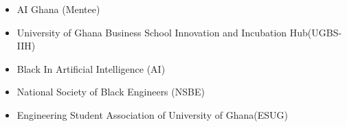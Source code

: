\documentclass[letterpaper,11pt]{article}
\newcommand{\resumeItem}[1]{
  \item\small{
    {#1 \vspace{-2pt}}
  }
}
\newcommand{\resumeItemListStart}{\begin{itemize}}
\newcommand{\resumeItemListEnd}{\end{itemize}\vspace{-5pt}}
\begin{document}
{{{{     \resumeItemListStart
     \resumeItem{AI Ghana (Mentee)} 
     \resumeItem{ University of Ghana Business School Innovation and Incubation Hub(UGBS-IIH)}
     \resumeItem{Black In Artificial Intelligence (AI)} 
     \resumeItem{National Society of Black Engineers (NSBE)}
     \resumeItem{Engineering Student Association of University of Ghana(ESUG)}
      \resumeItemListEnd

  
    

}}}}
\end{document}
